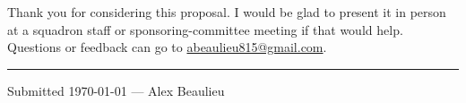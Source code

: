 \documentclass[11pt,letterpaper]{article}
\makeatletter
\newcommand{\propAuthor}{Alex Beaulieu}
\newcommand{\propEmail}{abeaulieu815@gmail.com}
\newcommand{\propDate}{\today}
\makeatother
\begin{document}
\vspace{1.5em}
\noindent
Thank you for considering this proposal. I would be glad to present it in person at a squadron staff or sponsoring-committee meeting if that would help. Questions or feedback can go to \href{mailto:\propEmail}{\propEmail}.

\vspace{2em}
\noindent\rule{\linewidth}{0.4pt}
\begin{center}
\small\color{muted}
Submitted \propDate{} --- \propAuthor
\end{center}
\end{document}
